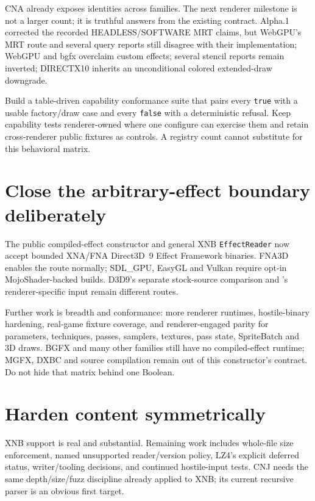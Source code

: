 CNA already exposes \RendererIdentityCount{} identities across \RendererFamilyCount{} families.
The next renderer milestone is not a
larger count; it is truthful answers from the existing contract.  Alpha.1 corrected the recorded
HEADLESS/SOFTWARE MRT claims, but WebGPU's MRT route and several query reports still disagree with
their implementation; WebGPU and bgfx overclaim custom effects; several stencil reports remain
inverted; DIRECTX10 inherits an unconditional
colored extended-draw downgrade.

Build a table-driven capability conformance suite that pairs every \texttt{true} with a usable
factory/draw case and every \texttt{false} with a deterministic refusal.  Keep capability tests
renderer-owned where one configure can exercise them and retain cross-renderer public fixtures as
controls.  A registry count cannot substitute for this behavioral matrix.

\section{Close the arbitrary-effect boundary deliberately}

The public compiled-effect constructor and general XNB \texttt{EffectReader} now accept bounded
XNA/FNA Direct3D~9 Effect Framework binaries. FNA3D enables the route normally; SDL\_GPU, EasyGL
and Vulkan require opt-in MojoShader-backed builds. D3D9's separate stock-source comparison and
's renderer-specific input remain different routes.

Further work is breadth and conformance: more renderer runtimes, hostile-binary hardening,
real-game fixture coverage, and renderer-engaged parity for parameters, techniques, passes,
samplers, textures, pass state, SpriteBatch and 3D draws. BGFX and many other families still have
no compiled-effect runtime; MGFX, DXBC and source compilation remain out of this constructor's
contract. Do not hide that matrix behind one Boolean.

\section{Harden content symmetrically}

XNB support is real and substantial.  Remaining work includes whole-file size enforcement, named
unsupported reader/version policy, LZ4's explicit deferred status, writer/tooling decisions, and
continued hostile-input tests.  CNJ needs the same depth/size/fuzz discipline already applied to
XNB; its current recursive parser is an obvious first target.

